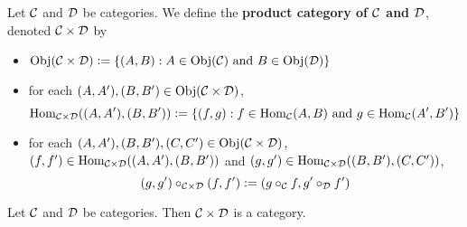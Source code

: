 \documentclass{book}
\begin{document}
	\begin{defn}
		Let $\mathcal{C}$ and $\mathcal{D}$ be categories. We define the \textbf{product category of $\mathcal{C}$ and $\mathcal{D}$}, denoted $\mathcal{C} \times \mathcal{D}$ by 
		\begin{itemize}
			\item $\operatorname{Obj}(\mathcal{C} \times \mathcal{D}) \vcentcolon= \{(A, B): A \in \operatorname{Obj}(\mathcal{C}) \text{ and } B \in \operatorname{Obj}(\mathcal{D})\}$
			\item for each $(A, A'), (B, B') \in \operatorname{Obj}(\mathcal{C} \times \mathcal{D})$, 
			$$\operatorname{Hom}_{\mathcal{C} \times \mathcal{D}}((A, A'), (B, B')) \vcentcolon= \{(f,g): f \in \operatorname{Hom}_{\mathcal{C}}(A, B) \text{ and }  g \in \operatorname{Hom}_{\mathcal{C}}(A', B') \}$$
			\item for each  $(A, A'), (B, B'), (C, C') \in \operatorname{Obj}(\mathcal{C} \times \mathcal{D})$, $(f, f') \in \operatorname{Hom}_{\mathcal{C} \times \mathcal{D}}((A, A'), (B, B'))$ and $(g, g') \in \operatorname{Hom}_{\mathcal{C} \times \mathcal{D}}((B, B'), (C, C'))$, 
			$$(g,g') \circ_{\mathcal{C} \times \mathcal{D}} (f, f') \vcentcolon=  (g \circ_{\mathcal{C}} f, g' \circ_{\mathcal{D}} f')$$
		\end{itemize}
	\end{defn}
	
	\begin{ex}
		Let $\mathcal{C}$ and $\mathcal{D}$ be categories. Then $\mathcal{C} \times \mathcal{D}$ is a category. 
	\end{ex}
	
\end{document}
